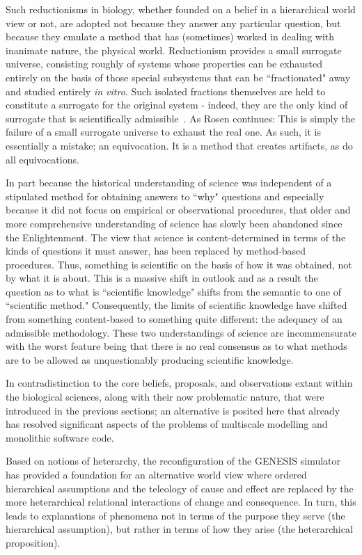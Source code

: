 \documentclass[11pt,3p,twocolumn]{JMN}
\begin{document}
Such reductionisms in biology, whether founded on a belief in a hierarchical world view or not, are adopted not because they answer any particular question, but because they emulate a method that has (sometimes) worked in dealing with inanimate nature, the physical world. Reductionism provides a small surrogate universe, consisting roughly of systems whose properties can be exhausted entirely on the basis of those special subsystems that can be ``fractionated" away and studied entirely \textit{in vitro}. Such isolated fractions themselves are held to constitute a surrogate for the original system - indeed, they are the only kind of surrogate that is scientifically admissible~\citep{rosen96}. As Rosen continues: This is simply the failure of a small surrogate universe to exhaust the real one. As such, it is essentially a mistake; an equivocation. It is a method that creates artifacts, as do all equivocations.

In part because the historical understanding of science was independent of a stipulated method for obtaining answers to ``why" questions and especially because it did not focus on empirical or observational procedures, that older and more comprehensive understanding of science has slowly been abandoned since the Enlightenment. The view that science is content-determined in terms of the kinds of questions it must answer, has been replaced by method-based procedures. Thus, something is scientific on the basis of how it was obtained, not by what it is about. This is a massive shift in outlook and as a result the question as to what is ``scientific knowledge" shifts from the semantic to one of ``scientific method." Consequently, the limits of scientific knowledge have shifted from something content-based to something quite different: the adequacy of an admissible methodology. These two understandings of science are incommensurate with the worst feature being that there is no real consensus as to what methods are to be allowed as unquestionably producing scientific knowledge.

In contradistinction to the core beliefs, proposals, and observations extant within the biological sciences, along with their now problematic nature, that were introduced in the previous sections; an alternative is posited here that already has resolved significant aspects of the problems of multiscale modelling and monolithic software code.

Based on notions of heterarchy, the reconfiguration of the GENESIS simulator has provided a foundation for an alternative world view where ordered hierarchical assumptions and the teleology of cause and effect are replaced by the more heterarchical relational interactions of change and consequence. In turn, this leads to explanations of phenomena not in terms of the purpose they serve (the hierarchical assumption), but rather in terms of how they arise (the heterarchical proposition).
\end{document}
